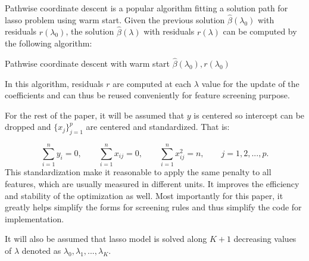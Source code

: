 \documentclass{article}
\begin{document}
Pathwise coordinate descent is a popular algorithm fitting a solution path for lasso problem using warm start. Given the previous solution $\hat{\beta}(\lambda_0)$ with residuals $r(\lambda_0)$, the solution $\hat{\beta}(\lambda)$ with residuals $r(\lambda)$ can be computed by the following algorithm:
\begin{algorithm}
    \SetAlgoLined
    \BlankLine
    \caption{Pathwise coordinate descent with warm start $\hat{\beta}(\lambda_0),r(\lambda_0)$}
\end{algorithm}

\noindent In this algorithm, residuals $r$ are computed at each $\lambda$ value for the update of the coefficients and can thus be reused conveniently for feature screening purpose.

For the rest of the paper, it will be assumed that $y$ is centered so intercept can be dropped and $\{x_j\}_{j=1}^p$ are centered and standardized. That is:

\begin{equation}
    \sum_{i=1}^ny_i=0, \qquad \sum_{i=1}^n x_{ij}=0, \qquad \sum_{i=1}^n x_{ij}^2=n,\qquad j=1,2,...,p.
\end{equation}
This standardization make it reasonable to apply the same penalty to all features, which are usually measured in different units. It improves the efficiency and stability of the optimization as well. Most importantly for this paper, it greatly helps simplify the forms for screening rules and thus simplify the code for implementation.

It will also be assumed that lasso model is solved along $K+1$ decreasing values of $\lambda$ denoted as $\lambda_0,\lambda_1,...,\lambda_K$.
\end{document}
